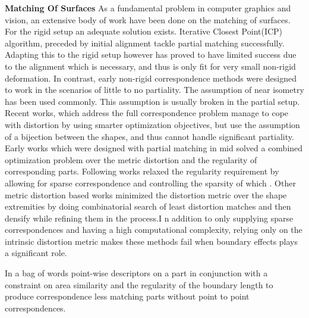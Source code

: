 \documentclass[10pt,twocolumn,letterpaper]{article}
\begin{document}
\textbf{Matching Of Surfaces}
As a fundamental problem in computer graphics and vision, an extensive body of work have been done on the matching of surfaces.
For the rigid setup an adequate solution exists. Iterative Closest Point(ICP)\cite{Aiger:2008:CSR:1360612.1360684} algorithm, preceded by initial alignment\cite{rusu2008towards} tackle partial matching successfully. Adapting this to the rigid setup however has proved to have limited success due to the alignment which is necessary, and thus is only fit for very small non-rigid deformation.
In contrast, early non-rigid correspondence methods were designed to work in the scenarios of little to no partiality. The assumption of near isometry\cite{bronstein2006generalized} has been used commonly. This assumption is usually broken in the partial setup. Recent works, which address the full correspondence problem\cite{aigerman2015seamless,maron2016point,solomon2016entropic,vestner2017product} manage to cope with distortion by using smarter optimization objectives, but use the assumption of a bijection between the shapes, and thus cannot handle significant partiality.
Early works which were designed with partial matching in mid\cite{bronstein2008not,bronstein2009partial} solved a combined optimization problem over the metric distortion and the regularity of corresponding parts. Following works relaxed the regularity requirement by allowing for sparse correspondence\cite{Torsello:2012:GAD:2354409.2354702} and controlling the sparsity of which \cite{rodola2013elastic}. Other metric distortion based works\cite{sahilliouglu2012scale,sahilliouglu2014multiple} minimized the distortion metric over the shape extremities by doing combinatorial search of least distortion matches and then densify while refining them in the process.I n addition to only supplying sparse correspondences and having a high computational complexity, relying only on the intrinsic distortion metric makes these methods fail when boundary effects plays a significant role.

In\cite{pokrass2013partial} a bag of words point-wise descriptors on a part in conjunction with a constraint on area similarity and the regularity of the boundary length to produce correspondence less matching parts without point to point correspondences.
\end{document}
